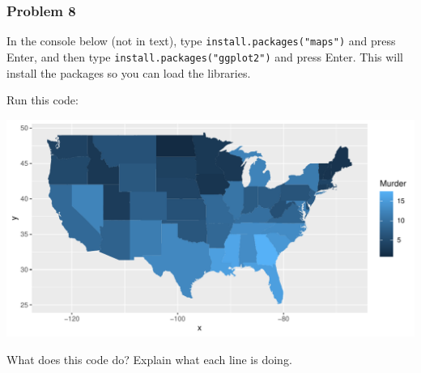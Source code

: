 \documentclass[
]{article}
\newenvironment{Shaded}{\begin{snugshade}}{\end{snugshade}}
\newcommand{\AttributeTok}[1]{\textcolor[rgb]{0.77,0.63,0.00}{#1}}
\newcommand{\FunctionTok}[1]{\textcolor[rgb]{0.00,0.00,0.00}{#1}}
\newcommand{\NormalTok}[1]{#1}
\newcommand{\SpecialCharTok}[1]{\textcolor[rgb]{0.00,0.00,0.00}{#1}}
\newcommand{\StringTok}[1]{\textcolor[rgb]{0.31,0.60,0.02}{#1}}
\begin{document}
\hypertarget{problem-8}{%
\subsubsection{Problem 8}\label{problem-8}}

In the console below (not in text), type
\texttt{install.packages("maps")} and press Enter, and then type
\texttt{install.packages("ggplot2")} and press Enter. This will install
the packages so you can load the libraries.

Run this code:

\begin{Shaded}
\end{Shaded}

\includegraphics{Journal_files/figure-latex/unnamed-chunk-8-1.pdf}

What does this code do? Explain what each line is doing.
\end{document}
